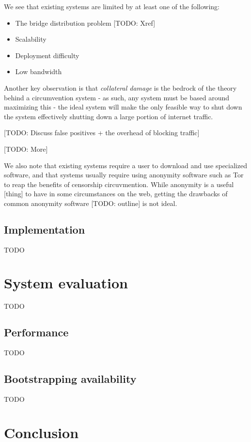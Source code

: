 \documentclass[12pt]{report}
\begin{document}
We see that existing systems are limited by at least one of the following:
\begin{itemize}
  \item The bridge distribution problem [TODO: Xref]
  \item Scalability
  \item Deployment difficulty
  \item Low bandwidth
\end{itemize}

Another key observation is that \emph{collateral damage} is the bedrock of the theory behind a circumvention system - as such, any system must be based around maximizing this - the ideal system will make the only feasible way to shut down the system effectively shutting down a large portion of internet traffic. 

[TODO: Discuss false positives + the overhead of blocking traffic]

[TODO: More]

We also note that existing systems require a user to download and use specialized software, and that systems usually require using anonymity software such as Tor to reap the benefits of censorship circuvmention. While anonymity is a useful [thing] to have in some circumstances on the web, getting the drawbacks of common anonymity software [TODO: outline] is not ideal.

\section{Implementation}

TODO

\chapter{System evaluation}

TODO

\section{Performance}

TODO

\section{Bootstrapping availability}

TODO

\chapter{Conclusion}
\end{document}
